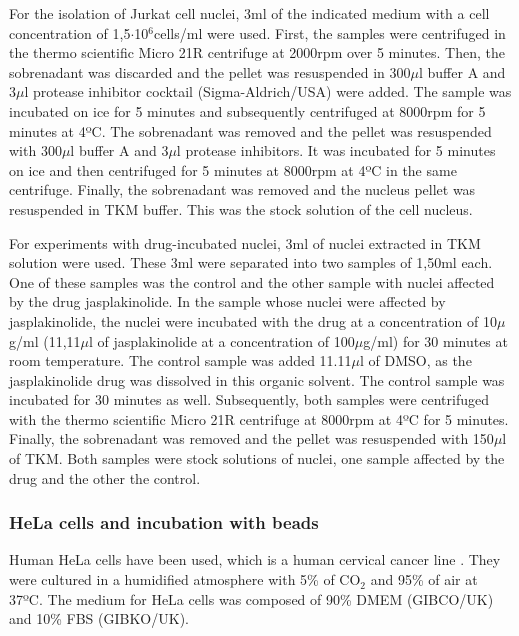 \documentclass[12pt, a4paper]{article} %
\begin{document}
\setlength{\parskip}{4mm}

For the isolation of Jurkat cell nuclei, 3ml of the indicated medium with a cell concentration of 1,5$\cdot$10$^6$cells/ml were used. First, the samples were centrifuged in the thermo scientific Micro 21R centrifuge at 2000rpm over 5 minutes. Then, the sobrenadant was discarded and the pellet was resuspended in 300$\mu$l buffer A and 3$\mu$l protease inhibitor cocktail (Sigma-Aldrich/USA) were added. The sample was incubated on ice for 5 minutes and subsequently centrifuged at 8000rpm for 5 minutes at 4ºC. The sobrenadant was removed and the pellet was resuspended with 300$\mu$l buffer A and 3$\mu$l protease inhibitors. It was incubated for 5 minutes on ice and then centrifuged for 5 minutes at 8000rpm at 4ºC in the same centrifuge. Finally, the sobrenadant was removed and the nucleus pellet was resuspended in TKM buffer. This was the stock solution of the cell nucleus.

For experiments with drug-incubated nuclei, 3ml of nuclei extracted in TKM solution were used. These 3ml were separated into two samples of 1,50ml each. One of these samples was the control and the other sample with nuclei affected by the drug jasplakinolide. In the sample whose nuclei were affected by jasplakinolide, the nuclei were incubated with the drug at a concentration of 10$\mu$g/ml (11,11$\mu$l of jasplakinolide at a concentration of 100$\mu$g/ml) for 30 minutes at room temperature. The control sample was added 11.11$\mu$l of DMSO, as the jasplakinolide drug was dissolved in this organic solvent. The control sample was incubated for 30 minutes as well. Subsequently, both samples were centrifuged with the thermo scientific Micro 21R centrifuge at 8000rpm at 4ºC for 5 minutes. Finally, the sobrenadant was removed and the pellet was resuspended with 150$\mu$l of TKM. Both samples were stock solutions of nuclei, one sample affected by the drug and the other the control.

\setlength{\parskip}{0mm}

\subsubsection{HeLa cells and incubation with beads}

Human HeLa cells have been used, which is a human cervical cancer line \cite{gey1952tissue}. They were cultured in a humidified atmosphere with 5\% of CO$_{2}$ and 95\% of air at 37ºC. The medium for HeLa cells was composed of 90\% DMEM (GIBCO/UK) and 10\% FBS (GIBKO/UK).
\end{document}
